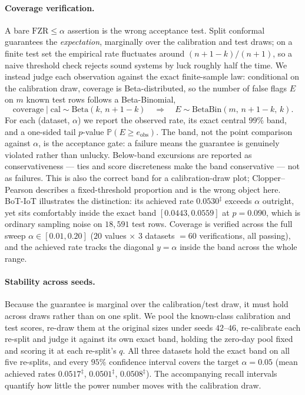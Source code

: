 \paragraph{Coverage verification.}
A bare $\mathrm{FZR} \leq \alpha$ assertion is the wrong acceptance test. Split conformal guarantees the
\emph{expectation}, marginally over the calibration and test draws; on a finite test set the empirical rate
fluctuates around $(n+1-k)/(n+1)$, so a naive threshold check rejects sound systems by luck roughly half the
time. We instead judge each observation against the exact finite-sample law: conditional on the calibration
draw, coverage is Beta-distributed, so the number of false flags $E$ on $m$ known test rows follows a
Beta-Binomial,
\begin{equation}
\mathrm{coverage} \mid \mathrm{cal} \sim \mathrm{Beta}(k,\, n{+}1{-}k)
\quad \Longrightarrow \quad
E \sim \mathrm{BetaBin}(m,\, n{+}1{-}k,\, k).
\end{equation}
For each (dataset, $\alpha$) we report the observed rate, its exact central $99\%$ band, and a one-sided
tail $p$-value $\mathbb{P}(E \geq e_{\mathrm{obs}})$. The band, not the point comparison against $\alpha$,
is the acceptance gate: a failure means the guarantee is genuinely violated rather than unlucky. Below-band
excursions are reported as conservativeness --- ties and score discreteness make the band conservative ---
not as failures. This is also the correct band for a calibration-draw plot; Clopper--Pearson describes a
fixed-threshold proportion and is the wrong object here. BoT-IoT illustrates the distinction: its achieved
rate $0.0530^{\ddag}$ exceeds $\alpha$ outright, yet sits comfortably inside the exact band
$[0.0443, 0.0559]$ at $p = 0.090$, which is ordinary sampling noise on $18{,}591$ test rows. Coverage is
verified across the full sweep $\alpha \in [0.01, 0.20]$ ($20$ values $\times$ $3$ datasets $=60$
verifications, all passing), and the achieved rate tracks the diagonal $y = \alpha$ inside the band across
the whole range.

\paragraph{Stability across seeds.}
Because the guarantee is marginal over the calibration/test draw, it must hold across draws rather than on
one split. We pool the known-class calibration and test scores, re-draw them at the original sizes under
seeds $42$--$46$, re-calibrate each re-split and judge it against its own exact band, holding the zero-day
pool fixed and scoring it at each re-split's $q$. All three datasets hold the exact band on all five
re-splits, and every $95\%$ confidence interval covers the target $\alpha = 0.05$ (mean achieved rates
$0.0517^{\ddag}$, $0.0501^{\ddag}$, $0.0508^{\ddag}$). The accompanying recall intervals quantify how little
the power number moves with the calibration draw.

